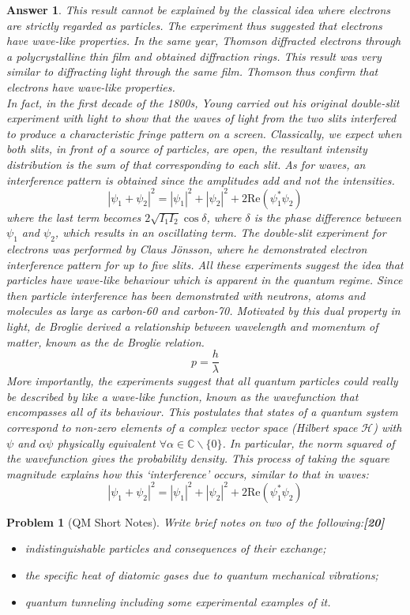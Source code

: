 \documentclass[a4paper]{article}
\newtheorem{ans}{Answer}[subsection]
\theoremstyle{new}
\newtheorem{qns}{Problem}[subsection]
\begin{document}
\begin{ans}
This result cannot be explained by the classical idea where electrons are strictly regarded as particles. The experiment thus suggested that electrons have wave-like properties. In the same year, Thomson diffracted electrons through a polycrystalline thin film and obtained diffraction rings. This result was very similar to diffracting light through the same film. Thomson thus confirm that electrons have wave-like properties.\\[5pt]
In fact, in the first decade of the 1800s, Young carried out his original double-slit experiment with light to show that the waves of light from the two slits interfered to produce a characteristic fringe pattern on a screen. Classically, we expect when both slits, in front of a source of particles, are open, the resultant intensity distribution is the sum of that corresponding to each slit. As for waves, an interference pattern is obtained since the amplitudes add and not the intensities.
$$|\psi_1+\psi_2|^2=|\psi_1|^2+|\psi_2|^2+2\text{Re}(\psi_1^*\psi_2)$$
where the last term becomes $2\sqrt{I_1I_2}\cos\delta$, where $\delta$ is the phase difference between $\psi_1$ and $\psi_2$, which results in an oscillating term. The double-slit experiment for electrons was performed by Claus J\"{o}nsson, where he demonstrated electron interference pattern for up to five slits. All these experiments suggest the idea that particles have wave-like behaviour which is apparent in the quantum regime. Since then particle interference has been demonstrated with neutrons, atoms and molecules as large as carbon-60 and carbon-70. Motivated by this dual property in light, de Broglie derived a relationship between wavelength and momentum of matter, known as the de Broglie relation.
$$p=\frac{h}{\lambda}$$
More importantly, the experiments suggest that all quantum particles could really be described by like a wave-like function, known as the wavefunction that encompasses all of its behaviour. This postulates that states of a quantum system correspond to non-zero elements of a complex vector space (Hilbert space $\mathcal{H}$) with $\psi$ and $\alpha\psi$ physically equivalent $\forall\alpha\in\mathbb{C}\backslash\{0\}$. In particular, the norm squared of the wavefunction gives the probability density.  This process of taking the square magnitude explains how this `interference' occurs, similar to that in waves:
$$|\psi_1+\psi_2|^2=|\psi_1|^2+|\psi_2|^2+2\text{Re}(\psi_1^*\psi_2)$$
\end{ans}
\newpage
\begin{qns}[QM Short Notes]
Write brief notes on two of the following:\hfill\textbf{[20]}
\begin{itemize}
    \item indistinguishable particles and consequences of their exchange;
    \item the specific heat of diatomic gases due to quantum mechanical vibrations;
    \item quantum tunneling including some experimental examples of it.
\end{itemize}
\end{qns}
\end{document}
